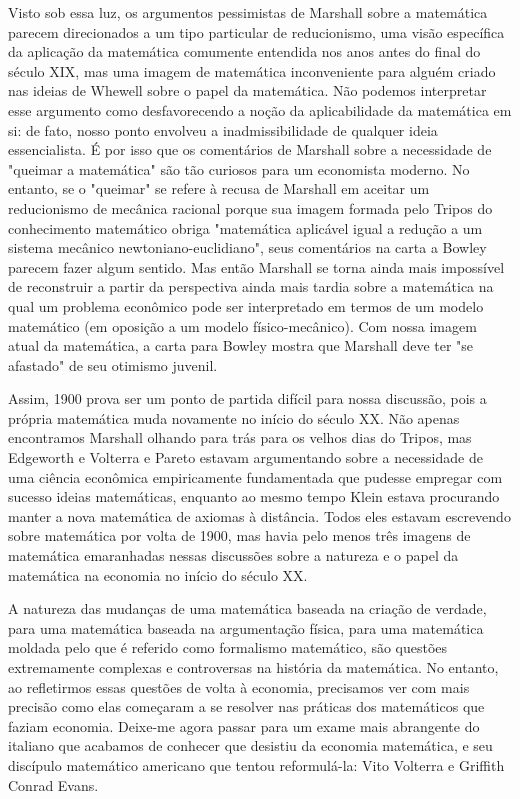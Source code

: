 \documentclass[12pt]{article}
\begin{document}
Visto sob essa luz, os argumentos pessimistas de Marshall sobre a matemática parecem direcionados a um tipo particular de reducionismo, uma visão específica da aplicação da matemática comumente entendida nos anos antes do final do século XIX, mas uma imagem de matemática inconveniente para alguém criado nas ideias de Whewell sobre o papel da matemática. Não podemos interpretar esse argumento como desfavorecendo a noção da aplicabilidade da matemática em si: de fato, nosso ponto envolveu a inadmissibilidade de qualquer ideia essencialista. É por isso que os comentários de Marshall sobre a necessidade de "queimar a matemática" são tão curiosos para um economista moderno. No entanto, se o "queimar" se refere à recusa de Marshall em aceitar um reducionismo de mecânica racional porque sua imagem formada pelo Tripos do conhecimento matemático obriga "matemática aplicável igual a redução a um sistema mecânico newtoniano-euclidiano", seus comentários na carta a Bowley parecem fazer algum sentido. Mas então Marshall se torna ainda mais impossível de reconstruir a partir da perspectiva ainda mais tardia sobre a matemática na qual um problema econômico pode ser interpretado em termos de um modelo matemático (em oposição a um modelo físico-mecânico). Com nossa imagem atual da matemática, a carta para Bowley mostra que Marshall deve ter "se afastado" de seu otimismo juvenil.

Assim, 1900 prova ser um ponto de partida difícil para nossa discussão, pois a própria matemática muda novamente no início do século XX. Não apenas encontramos Marshall olhando para trás para os velhos dias do Tripos, mas Edgeworth e Volterra e Pareto estavam argumentando sobre a necessidade de uma ciência econômica empiricamente fundamentada que pudesse empregar com sucesso ideias matemáticas, enquanto ao mesmo tempo Klein estava procurando manter a nova matemática de axiomas à distância. Todos eles estavam escrevendo sobre matemática por volta de 1900, mas havia pelo menos três imagens de matemática emaranhadas nessas discussões sobre a natureza e o papel da matemática na economia no início do século XX.

A natureza das mudanças de uma matemática baseada na criação de verdade, para uma matemática baseada na argumentação física, para uma matemática moldada pelo que é referido como formalismo matemático, são questões extremamente complexas e controversas na história da matemática. No entanto, ao refletirmos essas questões de volta à economia, precisamos ver com mais precisão como elas começaram a se resolver nas práticas dos matemáticos que faziam economia. Deixe-me agora passar para um exame mais abrangente do italiano que acabamos de conhecer que desistiu da economia matemática, e seu discípulo matemático americano que tentou reformulá-la: Vito Volterra e Griffith Conrad Evans.
\end{document}
